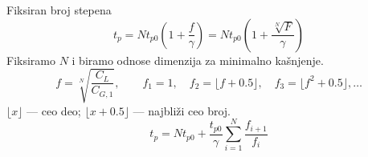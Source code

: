 \begin{frame}[label=09_3-s019]{Fiksiran broj stepena}
\[t_p=Nt_{p0}\left(1+\frac f\gamma\right)
=Nt_{p0}\left(1+\frac{\sqrt[N]F}\gamma\right)\]
\alert{Fiksiramo $N$} i biramo odnose dimenzija za minimalno kašnjenje.
\[f=\sqrt[N]{\frac{C_L}{C_{G,1}}},\qquad
f_1=1,\quad f_2=\lfloor f+0.5\rfloor,\quad f_3=\lfloor f^2+0.5\rfloor,\ldots\]
$\lfloor x\rfloor$ — ceo deo; $\lfloor x+0.5\rfloor$ — najbliži ceo broj.
\[t_p=Nt_{p0}+\frac{t_{p0}}\gamma\sum_{i=1}^N\frac{f_{i+1}}{f_i}\]
\end{frame}
